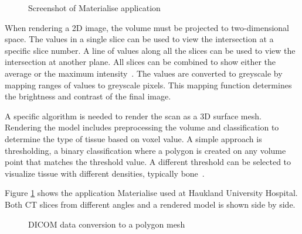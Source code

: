 \documentclass[a4paper]{report}
\begin{document}
\begin{figure}[h!]
    \centering
	\hfill
	\caption{Screenshot of Materialise application \cite{materialise_medical_nodate}}
 \label{mat}
\end{figure}

When rendering a 2D image, the volume must be projected to two-dimensional space. The values in a single slice can be used to view the intersection at a specific slice number. A line of values along all the slices can be used to view the intersection at another plane.
All slices can be combined to show either the average or the maximum intensity~\cite{fishman_volume_2006}.
The values are converted to greyscale by mapping ranges of values to greyscale pixels. This mapping function determines the brightness and contrast of the final image.

A specific algorithm is needed to render the scan as a 3D surface mesh. Rendering the model includes preprocessing the volume and classification to determine the type of tissue based on voxel value. A simple approach is thresholding, a binary classification where a polygon is created on any volume point that matches the threshold value. A different threshold can be selected to visualize tissue with different densities, typically bone~\cite{fishman_volume_2006}.

Figure \ref{mat} shows the application Materialise used at Haukland University Hospital. Both CT slices from different angles and a rendered model is shown side by side.

\begin{figure}[h!]
    \centering
	\hfill
  \caption{DICOM data conversion to a polygon mesh}
  \label{dicom}
\end{figure}
\end{document}
